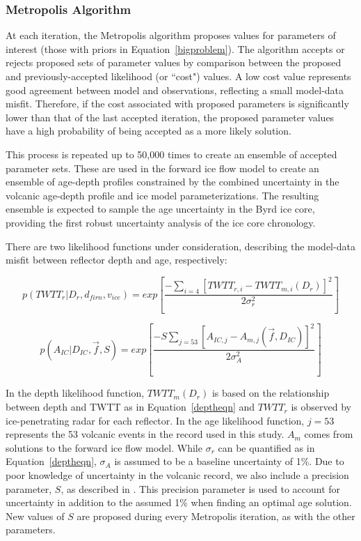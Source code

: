 \subsubsection{Metropolis Algorithm}\label{metrop}
At each iteration, the Metropolis algorithm proposes values for parameters of interest (those with priors in Equation~\ref{bigproblem}). The algorithm accepts or rejects proposed sets of parameter values by comparison between the proposed and previously-accepted likelihood (or ``cost") values. A low cost value represents good agreement between model and observations, reflecting a small model-data misfit. Therefore, if the cost associated with proposed parameters is significantly lower than that of the last accepted iteration, the proposed parameter values have a high probability of being accepted as a more likely solution. 

This process is repeated up to 50,000 times to create an ensemble of accepted parameter sets. These are used in the forward ice flow model to create an ensemble of age-depth profiles constrained by the combined uncertainty in the volcanic age-depth profile and ice model parameterizations. The resulting ensemble is expected to sample the age uncertainty in the Byrd ice core, providing the first robust uncertainty analysis of the ice core chronology. 

There are two likelihood functions under consideration, describing the model-data misfit between reflector depth and age, respectively:

\begin{equation}
p(TWTT_r | D_r,d_{firn},v_{ice} )= exp[\frac{-\sum_{i=4}[TWTT_{r,i} - TWTT_{m,i}(D_r)]^2}{2\sigma_r^2}]
\end{equation}

\begin{equation}
p(A_{IC} | D_{IC},\vec{f},S)= exp[\frac{-S\sum_{j = 53}[A_{IC,j} - A_{m,j}(\vec{f},D_{IC})]^2}{2\sigma_A^2}]
\end{equation}

In the depth likelihood function, $TWTT_m(D_r)$ is based on the relationship between depth and TWTT as in Equation~\ref{deptheqn} and $TWTT_r$ is observed by ice-penetrating radar for each reflector. In the age likelihood function, $j=53$ represents the 53 volcanic events in the record used in this study. $A_m$ comes from solutions to the forward ice flow model. While $\sigma_r$ can be quantified as in Equation~\ref{deptheqn}, $\sigma_A$ is assumed to be a baseline uncertainty of 1\%. Due to poor knowledge of uncertainty in the volcanic record, we also include a precision parameter, $S$, as described in \citet{jackson&huerta2016}. This precision parameter is used to account for uncertainty in addition to the assumed 1\% when finding an optimal age solution. New values of $S$ are proposed during every Metropolis iteration, as with the other parameters. 

